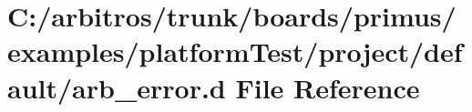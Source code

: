 \hypertarget{boards_2primus_2examples_2platform_test_2project_2default_2arb__error_8d}{\section{C\-:/arbitros/trunk/boards/primus/examples/platform\-Test/project/default/arb\-\_\-error.d File Reference}
\label{boards_2primus_2examples_2platform_test_2project_2default_2arb__error_8d}
}
